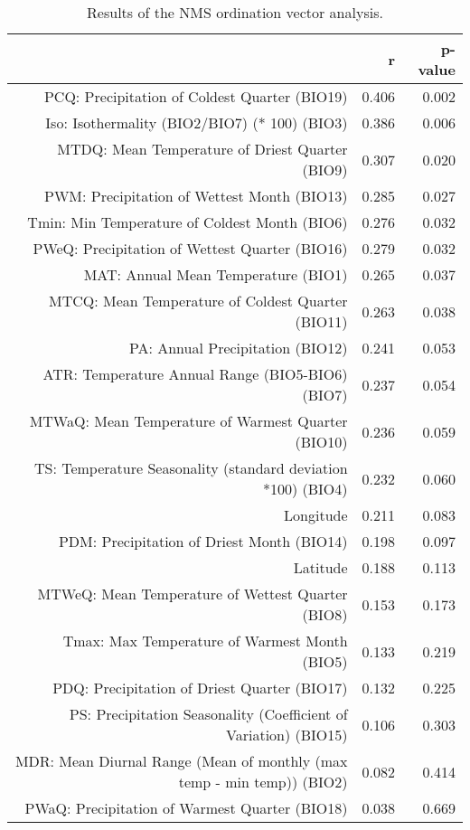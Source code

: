 \begin{table}[ht]
\centering
\begin{tabular}{rrr}
  \hline
 & r & p-value \\ 
  \hline
PCQ: Precipitation of Coldest Quarter (BIO19) & 0.406 & 0.002 \\ 
  Iso: Isothermality (BIO2/BIO7) (* 100) (BIO3) & 0.386 & 0.006 \\ 
  MTDQ: Mean Temperature of Driest Quarter (BIO9) & 0.307 & 0.020 \\ 
  PWM: Precipitation of Wettest Month (BIO13) & 0.285 & 0.027 \\ 
  Tmin: Min Temperature of Coldest Month (BIO6) & 0.276 & 0.032 \\ 
  PWeQ: Precipitation of Wettest Quarter (BIO16) & 0.279 & 0.032 \\ 
  MAT: Annual Mean Temperature (BIO1) & 0.265 & 0.037 \\ 
  MTCQ: Mean Temperature of Coldest Quarter (BIO11) & 0.263 & 0.038 \\ 
  PA: Annual Precipitation (BIO12) & 0.241 & 0.053 \\ 
  ATR: Temperature Annual Range (BIO5-BIO6) (BIO7) & 0.237 & 0.054 \\ 
  MTWaQ: Mean Temperature of Warmest Quarter (BIO10) & 0.236 & 0.059 \\ 
  TS: Temperature Seasonality (standard deviation *100) (BIO4) & 0.232 & 0.060 \\ 
  Longitude & 0.211 & 0.083 \\ 
  PDM: Precipitation of Driest Month (BIO14) & 0.198 & 0.097 \\ 
  Latitude & 0.188 & 0.113 \\ 
  MTWeQ: Mean Temperature of Wettest Quarter (BIO8) & 0.153 & 0.173 \\ 
  Tmax: Max Temperature of Warmest Month (BIO5) & 0.133 & 0.219 \\ 
  PDQ: Precipitation of Driest Quarter (BIO17) & 0.132 & 0.225 \\ 
  PS: Precipitation Seasonality (Coefficient of Variation) (BIO15) & 0.106 & 0.303 \\ 
  MDR: Mean Diurnal Range (Mean of monthly (max temp - min temp)) (BIO2) & 0.082 & 0.414 \\ 
  PWaQ: Precipitation of Warmest Quarter (BIO18) & 0.038 & 0.669 \\ 
   \hline
\end{tabular}
\caption{Results of the NMS ordination vector analysis.} 
\label{tab:wc_vec}
\end{table}
